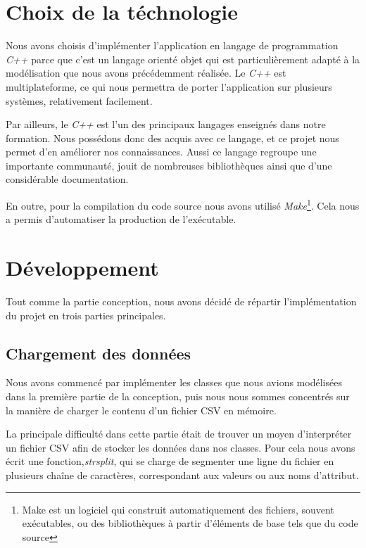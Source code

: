 \documentclass[oneside,13pt,a4paper]{report}
\begin{document}
\section{Choix de la téchnologie}
Nous avons choisis d'implémenter l'application en langage de programmation \textit{C++} parce que c'est un langage orienté objet qui est particulièrement adapté à la modélisation que nous avons précédemment réalisée. Le \textit{C++} est multiplateforme, ce qui nous permettra de porter l'application sur plusieurs systèmes, relativement facilement.

Par ailleurs, le \textit{C++} est l'un des principaux langages enseignés dans notre formation. Nous possédons donc des acquis avec ce langage, et ce projet nous permet d'en améliorer nos connaissances. Aussi ce langage regroupe une importante communauté, jouit de nombreuses bibliothèques ainsi que d'une considérable documentation.

En outre, pour la compilation du code source nous avons utilisé \textit{Make}\footnote{Make est un logiciel qui construit automatiquement des fichiers, souvent exécutables, ou des bibliothèques à partir d'éléments de base tels que du code source}. Cela nous a permis d'automatiser la production de l'exécutable.

\section{Développement}

Tout comme la partie conception, nous avons décidé de répartir l'implémentation du projet en trois parties principales.

\subsection{Chargement des données}

Nous avons commencé par implémenter les classes que nous avions modélisées dans la première partie de la conception, puis nous nous sommes concentrés sur la manière de charger le contenu d'un fichier CSV en mémoire.

La principale difficulté dans cette partie était de trouver un moyen d'interpréter un fichier CSV afin de stocker les données dans nos classes. Pour cela nous avons écrit une fonction,\textit{strsplit}, qui se charge de segmenter une ligne du fichier en plusieurs chaîne de caractères, correspondant aux valeurs ou aux noms d'attribut.
\end{document}
